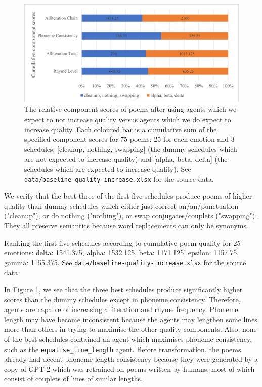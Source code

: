 \documentclass[a4paper,10pt]{article}
\begin{document}
\begin{figure}[htb!]
\centering
\includegraphics[width=1\textwidth]{media/baseline-quality-increase.png}
\caption{The relative component scores of poems after using agents which we expect to not increase quality versus agents which we do expect to increase quality. Each coloured bar is a cumulative sum of the specified component scores for 75 poems: 25 for each emotion and 3 schedules: [cleanup, nothing, swapping] (the dummy schedules which are not expected to increase quality) and [alpha, beta, delta] (the schedules which are expected to increase quality). See \texttt{data/baseline-quality-increase.xlsx} for the source data.}
\label{fig:baseline-quality-increase}
\end{figure}

We verify that the best three of the first five schedules produce poems of higher quality than dummy schedules which either just correct an/an/punctuation ("cleanup"), or do nothing ("nothing"), or swap conjugates/couplets ("swapping"). They all preserve semantics because word replacements can only be synonyms.

Ranking the first five schedules according to cumulative poem quality for 25 emotions: delta: 1541.375, alpha: 1532.125, beta: 1171.125, epsilon: 1157.75, gamma: 1155.375. See \texttt{data/baseline-quality-increase.xlsx} for the source data.

In Figure \ref{fig:baseline-quality-increase}, we see that the three best schedules produce significantly higher scores than the dummy schedules except in phoneme consistency. Therefore, agents are capable of increasing alliteration and rhyme frequency. Phoneme length may have become inconsistent because the agents may lengthen some lines more than others in trying to maximise the other quality components. Also, none of the best schedules contained an agent which maximises phoneme consistency, such as the \texttt{equalise\_line\_length} agent. Before transformation, the poems already had decent phoneme length consistency because they were generated by a copy of GPT-2 which was retrained on poems written by humans, most of which consist of couplets of lines of similar lengths.
\end{document}
